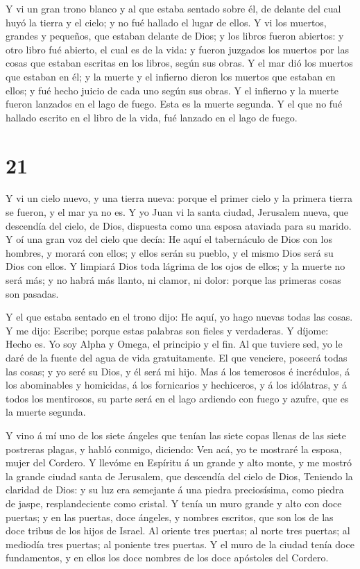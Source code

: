  Y vi un gran trono blanco y al que estaba sentado sobre
él, de delante del cual huyó la tierra y el cielo; y no fué hallado el
lugar de ellos.  Y vi los muertos, grandes y pequeños, que
estaban delante de Dios; y los libros fueron abiertos: y otro libro fué
abierto, el cual es de la vida: y fueron juzgados los muertos por las
cosas que estaban escritas en los libros, según sus obras. 
Y el mar dió los muertos que estaban en él; y la muerte y el infierno
dieron los muertos que estaban en ellos; y fué hecho juicio de cada uno
según sus obras.  Y el infierno y la muerte fueron lanzados
en el lago de fuego. Esta es la muerte segunda.  Y el que
no fué hallado escrito en el libro de la vida, fué lanzado en el lago de
fuego.

\hypertarget{section-20}{%
\section{21}\label{section-20}}

 Y vi un cielo nuevo, y una tierra nueva: porque el primer
cielo y la primera tierra se fueron, y el mar ya no es.  Y
yo Juan vi la santa ciudad, Jerusalem nueva, que descendía del cielo, de
Dios, dispuesta como una esposa ataviada para su marido.  Y
oí una gran voz del cielo que decía: He aquí el tabernáculo de Dios con
los hombres, y morará con ellos; y ellos serán su pueblo, y el mismo
Dios será su Dios con ellos.  Y limpiará Dios toda lágrima
de los ojos de ellos; y la muerte no será más; y no habrá más llanto, ni
clamor, ni dolor: porque las primeras cosas son pasadas.

 Y el que estaba sentado en el trono dijo: He aquí, yo hago
nuevas todas las cosas. Y me dijo: Escribe; porque estas palabras son
fieles y verdaderas.  Y díjome: Hecho es. Yo soy Alpha y
Omega, el principio y el fin. Al que tuviere sed, yo le daré de la
fuente del agua de vida gratuitamente.  El que venciere,
poseerá todas las cosas; y yo seré su Dios, y él será mi hijo.
 Mas á los temerosos é incrédulos, á los abominables y
homicidas, á los fornicarios y hechiceros, y á los idólatras, y á todos
los mentirosos, su parte será en el lago ardiendo con fuego y azufre,
que es la muerte segunda.

 Y vino á mí uno de los siete ángeles que tenían las siete
copas llenas de las siete postreras plagas, y habló conmigo, diciendo:
Ven acá, yo te mostraré la esposa, mujer del Cordero.  Y
llevóme en Espíritu á un grande y alto monte, y me mostró la grande
ciudad santa de Jerusalem, que descendía del cielo de Dios,
 Teniendo la claridad de Dios: y su luz era semejante á una
piedra preciosísima, como piedra de jaspe, resplandeciente como cristal.
 Y tenía un muro grande y alto con doce puertas; y en las
puertas, doce ángeles, y nombres escritos, que son los de las doce
tribus de los hijos de Israel.  Al oriente tres puertas; al
norte tres puertas; al mediodía tres puertas; al poniente tres puertas.
 Y el muro de la ciudad tenía doce fundamentos, y en ellos
los doce nombres de los doce apóstoles del Cordero.


